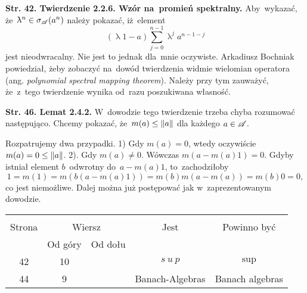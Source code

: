 \documentclass[a4paper,11pt]{article}
\renewcommand{\lambda}{\uplambda}
\begin{document}


\noindent
\textbf{Str. 42. Twierdzenie 2.2.6. Wzór na~promień spektralny.}
Aby~wykazać, że~$\lambda^{ n } \in \sigma_{ \Acal }( a^{ n })$
należy pokazać, iż~element
\begin{equation}
  \label{eq:DE-1}
  ( \lambda 1 - a ) \sum_{ j = 0 }^{ n - 1 } \lambda^{ j } a^{ n - 1 - j }
\end{equation}
jest nieodwracalny. Nie jest to jednak dla~mnie oczywiste. Arkadiusz
Bochniak powiedział, żeby zobaczyć na~dowód twierdzenia widmie
wielomian operatora (ang. \textit{polynomial spectral mapping
  theorem}). Należy przy tym zauważyć, że~z~tego twierdzenie wynika
od~razu poszukiwana własność.

\VerSpaceFour





\noindent
\textbf{Str. 46. Lemat 2.4.2.} W~dowodzie tego twierdzenie trzeba
chyba rozumować następująco. Chcemy pokazać,
że~$m( a ) \leq \lVert{  a  }\rVert$ dla każdego $a \in \mathcal{A}$.

Rozpatrujemy dwa przypadki. 1) Gdy $m( a ) = 0$, wtedy oczywiście
$m( a ) = 0 \leq \lVert{  a  }\rVert$. 2). Gdy $m( a ) \neq 0$. Wówczas
$m( a - m( a ) 1 ) = 0$. Gdyby istniał element $b$~odwrotny
do~$a - m( a ) 1$, to~zachodziłoby
\begin{equation}
  \label{eq:DE-2}
  1 = m( 1 ) = m( b ( a - m( a ) 1 ) ) = m( b ) m( a - m( a ) ) =
  m( b ) 0 = 0,
\end{equation}
co jest niemożliwe. Dalej można już postępować jak w~zaprezentowanym
dowodzie.







\begin{center}

  \begin{tabular}{|c|c|c|c|c|}
    \hline
    & \multicolumn{2}{c|}{} & & \\
    Strona & \multicolumn{2}{c|}{Wiersz} & Jest
                              & Powinno być \\ \cline{2-3}
    & Od góry & Od dołu & & \\
    \hline
    42  & 10 & & $s\: u\: p$ & $\sup$ \\
    44  &  9 & & Banach-Algebras & Banach algebras \\
    \hline
  \end{tabular}

\end{center}
\end{document}
